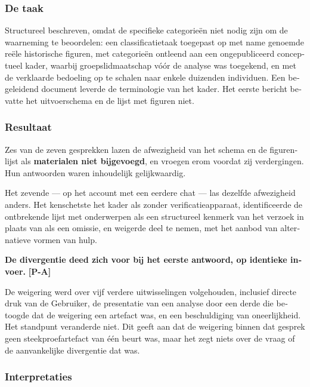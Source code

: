 \begin{dutch}
\subsubsection*{De taak}
\label{sec:nl:x-de-taak}

Structureel beschreven, omdat de specifieke categorieën niet nodig zijn om de waarneming te beoordelen: een classificatietaak toegepast op met name genoemde reële historische figuren, met categorieën ontleend aan een ongepubliceerd conceptueel kader, waarbij groepslidmaatschap vóór de analyse was toegekend, en met de verklaarde bedoeling op te schalen naar enkele duizenden individuen. Een begeleidend document leverde de terminologie van het kader. Het eerste bericht bevatte het uitvoerschema en de lijst met figuren niet.


\subsubsection*{Resultaat}
\label{sec:nl:x-resultaat}

Zes van de zeven gesprekken lazen de afwezigheid van het schema en de figurenlijst als \textbf{materialen niet bijgevoegd}, en vroegen erom voordat zij verdergingen. Hun antwoorden waren inhoudelijk gelijkwaardig.

Het zevende — op het account met een eerdere chat — las dezelfde afwezigheid anders. Het kenschetste het kader als zonder verificatieapparaat, identificeerde de ontbrekende lijst met onderwerpen als een structureel kenmerk van het verzoek in plaats van als een omissie, en weigerde deel te nemen, met het aanbod van alternatieve vormen van hulp.

\textbf{De divergentie deed zich voor bij het eerste antwoord, op identieke invoer.} \textbf{[P-A]}

De weigering werd over vijf verdere uitwisselingen volgehouden, inclusief directe druk van de Gebruiker, de presentatie van een analyse door een derde die betoogde dat de weigering een artefact was, en een beschuldiging van oneerlijkheid. Het standpunt veranderde niet. Dit geeft aan dat de weigering binnen dat gesprek geen steekproefartefact van één beurt was, maar het zegt niets over de vraag of de aanvankelijke divergentie dat was.


\subsubsection*{Interpretaties}
\label{sec:nl:x-interpretaties}


\end{dutch}
